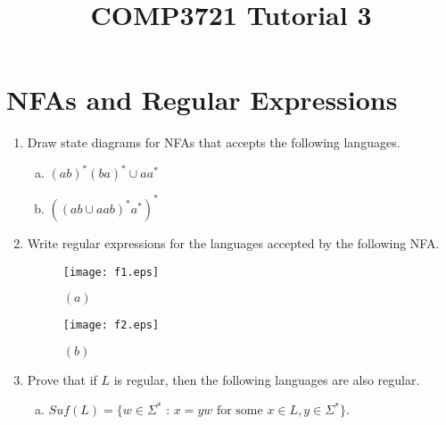 \documentclass[a4paper]{article}
\date{}
\author{}
\title{COMP3721 Tutorial 3}
\theoremstyle{definition}
\numberwithin{equation}{subsection}
\begin{document}
\maketitle
\section{NFAs and Regular Expressions}
\begin{enumerate}[1.]
\item Draw state diagrams for NFAs that accepts the following languages.
    \begin{enumerate}[(a)]
        \item $(ab)^*(ba)^*\cup aa^*$
        \item $((ab\cup aab)^*a^*)^*$
    \end{enumerate}

\item Write regular expressions for the languages accepted by the following NFA.
    \begin{figure}[h]
        \centering 
        \texttt{[image: f1.eps]}
        \caption{$(a)$}
    \end{figure}
    \begin{figure}[h]
        \centering
        \texttt{[image: f2.eps]}
        \caption{$(b)$}
    \end{figure}
    

\item Prove that if $L$ is regular, then the following languages are also regular.
    \begin{enumerate}[(a)]
        \item $Suf(L) = \{\textrm{$w\in \Sigma^*$ : $x = yw$ for some $x\in L, y\in\Sigma^*$}\}$.
    \end{enumerate}
\end{enumerate}
\end{document}
